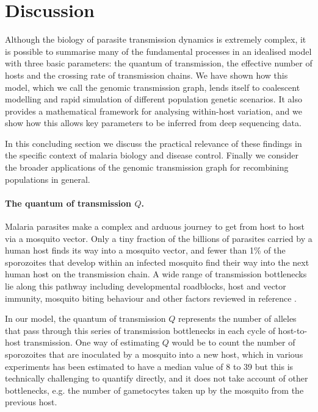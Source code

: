 \documentclass[_main.tex]{subfiles}
\begin{document}
\section*{Discussion}

Although the biology of parasite transmission dynamics is extremely complex, it is possible to summarise many of the fundamental processes in an idealised model with three basic parameters: the quantum of transmission, the effective number of hosts and the crossing rate of transmission chains.  We have shown how this model, which we call the genomic transmission graph, lends itself to coalescent modelling and rapid simulation of different population genetic scenarios.  It also provides a mathematical framework for analysing within-host variation, and we show how this allows key parameters to be inferred from deep sequencing data.  

In this concluding section we discuss the practical relevance of these findings in the specific context of malaria biology and disease control.  Finally we consider the broader applications of the genomic transmission graph for recombining populations in general.

\paragraph{The quantum of transmission $Q$.}   Malaria parasites make a complex and arduous journey to get from host to host via a mosquito vector.  Only a tiny fraction of the billions of parasites carried by a human host finds its way into a mosquito vector, and fewer than 1\% of the sporozoites that develop within an infected mosquito find their way into the next human host on the transmission chain.  A wide range of transmission bottlenecks lie along this pathway including developmental roadblocks, host and vector immunity, mosquito biting behaviour and other factors reviewed in reference \cite{Graumans2020}.

In our model, the quantum of transmission $Q$ represents the number of alleles that pass through this series of transmission bottlenecks in each cycle of host-to-host transmission. One way of estimating $Q$ would be to count the number of sporozoites that are inoculated by a mosquito into a new host, which in various experiments has been estimated to have a median value of 8 to 39 \cite{Graumans2020} but this is technically challenging to quantify directly, and it does not take account of other bottlenecks, e.g. the number of gametocytes taken up by the mosquito from the previous host.  
\end{document}
